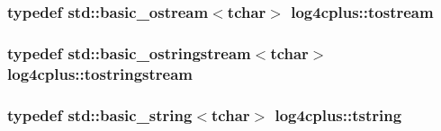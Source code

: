 \hypertarget{namespacelog4cplus_aef9e0c9a1adafed82c39fdef478716e1}{
\subsubsection[{tostream}]{\setlength{\rightskip}{0pt plus 5cm}typedef std\-::basic\-\_\-ostream$<${\bf tchar}$>$ {\bf log4cplus\-::tostream}}}\label{namespacelog4cplus_aef9e0c9a1adafed82c39fdef478716e1}
\hypertarget{namespacelog4cplus_a6c2af4aefe22c776bb931aa272df1123}{
\subsubsection[{tostringstream}]{\setlength{\rightskip}{0pt plus 5cm}typedef std\-::basic\-\_\-ostringstream$<${\bf tchar}$>$ {\bf log4cplus\-::tostringstream}}}\label{namespacelog4cplus_a6c2af4aefe22c776bb931aa272df1123}
\hypertarget{namespacelog4cplus_a3c9287f6ebcddc50355e29d71152117b}{
\subsubsection[{tstring}]{\setlength{\rightskip}{0pt plus 5cm}typedef std\-::basic\-\_\-string$<${\bf tchar}$>$ {\bf log4cplus\-::tstring}}}\label{namespacelog4cplus_a3c9287f6ebcddc50355e29d71152117b}


